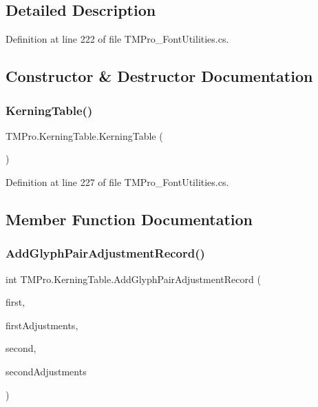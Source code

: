 \subsection{Detailed Description}


Definition at line 222 of file T\+M\+Pro\+\_\+\+Font\+Utilities.\+cs.



\subsection{Constructor \& Destructor Documentation}
\mbox{\label{class_t_m_pro_1_1_kerning_table_acb28a4ae6fdf222649652f91218cae9c}} 
\subsubsection{\texorpdfstring{KerningTable()}{KerningTable()}}
{\footnotesize\ttfamily T\+M\+Pro.\+Kerning\+Table.\+Kerning\+Table (\begin{DoxyParamCaption}{ }\end{DoxyParamCaption})}



Definition at line 227 of file T\+M\+Pro\+\_\+\+Font\+Utilities.\+cs.



\subsection{Member Function Documentation}
\mbox{\label{class_t_m_pro_1_1_kerning_table_aeb4f4cb379a55e749915ac0a2be4de7b}} 
\subsubsection{\texorpdfstring{AddGlyphPairAdjustmentRecord()}{AddGlyphPairAdjustmentRecord()}}
{\footnotesize\ttfamily int T\+M\+Pro.\+Kerning\+Table.\+Add\+Glyph\+Pair\+Adjustment\+Record (\begin{DoxyParamCaption}\item[{uint}]{first,  }\item[{\mbox{\hyperlink{struct_t_m_pro_1_1_glyph_value_record}{Glyph\+Value\+Record}}}]{first\+Adjustments,  }\item[{uint}]{second,  }\item[{\mbox{\hyperlink{struct_t_m_pro_1_1_glyph_value_record}{Glyph\+Value\+Record}}}]{second\+Adjustments }\end{DoxyParamCaption})}



